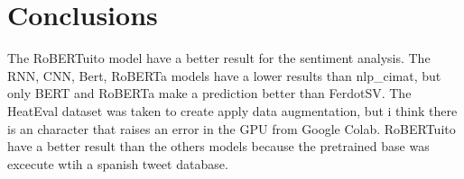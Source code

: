 \section{Conclusions}

The RoBERTuito model have a better result for the sentiment analysis. The RNN, CNN, Bert, RoBERTa models have a lower results than nlp\_cimat, but only BERT and RoBERTa make a prediction better than FerdotSV. The HeatEval dataset was taken to create apply data augmentation, but i think there is an character that raises an error in the GPU from Google Colab. RoBERTuito have a better result than the others models because the pretrained base was excecute wtih a spanish tweet database.